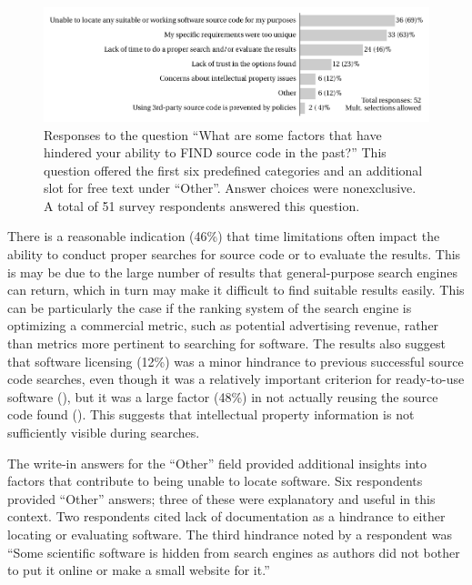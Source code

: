 \documentclass{casicswhitepaper}
\begin{document}
\begin{figure}[htb]
  \centering
  \includegraphics[width=6in]{files/plots/factors-that-hindered-finding-src.pdf}
  \vspace*{-4ex}
  \caption{Responses to the question ``What are some factors that have hindered your ability to FIND source code in the past?''  This question offered the first six predefined categories and an additional slot for free text under ``Other''.  Answer choices were nonexclusive.  A total of 51 survey respondents answered this question.}
  \label{factors-that-hindered}
\end{figure}

There is a reasonable indication (46\%) that time limitations often impact the ability to conduct proper searches for source code or to evaluate the results. This is may be due to the large number of results that general-purpose search engines can return, which in turn may make it difficult to find suitable results easily. This can be particularly the case if the ranking system of the search engine is optimizing a commercial metric, such as potential advertising revenue, rather than metrics more pertinent to searching for software.  The results also suggest that software licensing (12\%) was a minor hindrance to previous successful source code searches, even though it was a relatively important criterion for ready-to-use software (), but it was a large factor (48\%) in not actually reusing the source code found (). This suggests that intellectual property information is not sufficiently visible during searches.

%

The write-in answers for the ``Other'' field provided additional insights into factors that contribute to being unable to locate software.  Six respondents provided ``Other'' answers; three of these were explanatory and useful in this context.  Two respondents cited lack of documentation as a hindrance to either locating or evaluating software.  The third hindrance noted by a respondent was ``Some scientific software is hidden from search engines as authors did not bother to put it online or make a small website for it.''
\end{document}
